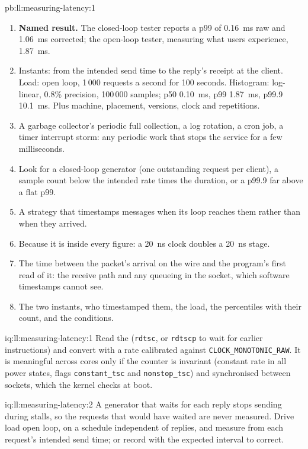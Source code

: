 \begin{solution}{pb:ll:measuring-latency:1}
\begin{enumerate}
the report would have no tail.
\item \textbf{Named result.} The closed-loop tester reports a p99 of \qty{0.16}{\milli\second} raw and
\qty{1.06}{\milli\second} corrected; the open-loop tester, measuring what users experience, \qty{1.87}{\milli\second}.
\item Instants: from the intended send time to the reply's receipt at the client. Load: open loop, 1\,000 requests a
second for 100 seconds. Histogram: log-linear, 0.8\% precision, 100\,000 samples; p50 \qty{0.10}{\milli\second}, p99
\qty{1.87}{\milli\second}, p99.9 \qty{10.1}{\milli\second}. Plus machine, placement, versions, clock and repetitions.
\item A garbage collector's periodic full collection, a log rotation, a cron job, a timer interrupt storm: any periodic
work that stops the service for a few milliseconds.
\item Look for a closed-loop generator (one outstanding request per client), a sample count below the intended rate times
the duration, or a p99.9 far above a flat p99.
\item A strategy that timestamps messages when its loop reaches them rather than when they arrived.
\item Because it is inside every figure: a \qty{20}{\nano\second} clock doubles a \qty{20}{\nano\second} stage.
\item The time between the packet's arrival on the wire and the program's first read of it: the receive path and any
queueing in the socket, which software timestamps cannot see.
\item The two instants, who timestamped them, the load, the percentiles with their count, and the conditions.
\end{enumerate}
\end{solution}

\begin{solution}{iq:ll:measuring-latency:1}
Read the  (\texttt{rdtsc}, or \texttt{rdtscp} to wait for earlier instructions) and convert with a rate
calibrated against \texttt{CLOCK\_MONOTONIC\_RAW}. It is meaningful across cores only if the counter is invariant
(constant rate in all power states, flags \texttt{constant\_tsc} and \texttt{nonstop\_tsc}) and synchronised between
sockets, which the kernel checks at boot.
\end{solution}

\begin{solution}{iq:ll:measuring-latency:2}
A generator that waits for each reply stops sending during stalls, so the requests that would have waited are never
measured. Drive load open loop, on a schedule independent of replies, and measure from each request's intended send time;
or record with the expected interval to correct.
\end{solution}

